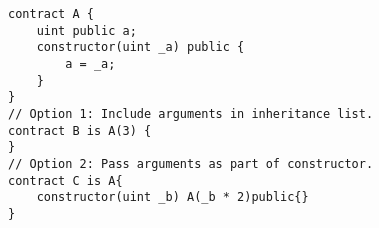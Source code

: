 \begin{lstlisting}[language=Solidity]
contract A {
	uint public a;
	constructor(uint _a) public {
		a = _a;
	}
}
// Option 1: Include arguments in inheritance list.
contract B is A(3) {
}
// Option 2: Pass arguments as part of constructor.
contract C is A{
	constructor(uint _b) A(_b * 2)public{}
}
\end{lstlisting}